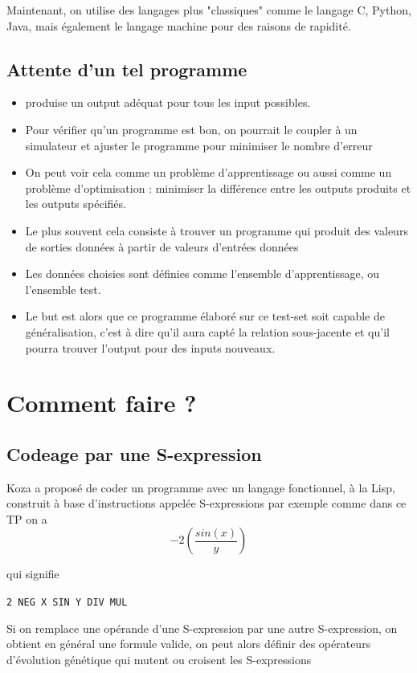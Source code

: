 Maintenant, on utilise des langages plus "classiques" comme le langage C, Python, Java, mais également le langage machine pour des raisons de rapidité.\\
\subsection{Attente d'un tel programme}
\begin{itemize}
\item produise un output adéquat pour tous les input possibles.
\item Pour vérifier qu'un programme est bon, on pourrait le
coupler à un simulateur et ajuster le programme pour
minimiser le nombre d'erreur
\item On peut voir cela comme un problème d'apprentissage ou aussi comme un problème d'optimisation : minimiser la différence entre les outputs produits et les outputs spécifiés.
\item Le plus souvent cela consiste à trouver un programme qui
produit des valeurs de sorties données à partir de valeurs
d'entrées données
\item  Les données choisies sont définies comme l'ensemble
d'apprentissage, ou l'ensemble test.
\item Le but est alors que ce programme élaboré sur ce test-set soit
capable de généralisation, c'est à dire qu'il aura capté la
relation sous-jacente et qu'il pourra trouver l'output pour des
inputs nouveaux.

\end{itemize}

\section{Comment faire ?}
\subsection{Codeage par une S-expression}
Koza a proposé de coder un programme avec un langage
fonctionnel, à la Lisp, construit à base d'instructions appelée
S-expressions par exemple comme dans ce TP on a 
\begin{equation}
-2 (\frac{sin(x)}{y})
\end{equation}

qui signifie 
\begin{center}\texttt{2 NEG X SIN Y DIV MUL}
\end{center}
Si on remplace une opérande d'une S-expression par une autre
S-expression, on obtient en général une formule valide, on peut alors définir des opérateurs 
d'évolution génétique qui
mutent ou croisent les S-expressions
